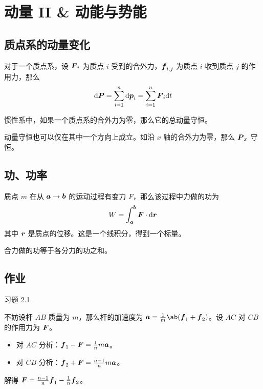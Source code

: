 \section{动量 II \& 动能与势能}

\subsection{质点系的动量变化}

\begin{theorem}[质点系的动量变化定理]
    对于一个质点系，设 $\boldsymbol{F}_i$ 为质点 $i$ 受到的合外力，$\boldsymbol{f}_{i, j}$ 为质点 $i$ 收到质点 $j$ 的作用力，那么
    $$
    \dd \boldsymbol{P} = \sum_{i=1}^n \dd \boldsymbol{p}_i = \sum_{i=1}^n \boldsymbol{F}_i \dd t
    $$
\end{theorem}

\begin{theorem}[动量守恒定律]
    惯性系中，如果一个质点系的合外力为零，那么它的总动量守恒。
\end{theorem}

动量守恒也可以仅在其中一个方向上成立。如沿 $x$ 轴的合外力为零，那么 $\boldsymbol{P}_x$ 守恒。

\subsection{功、功率}

质点 $m$ 在从 $\boldsymbol{a} \to \boldsymbol{b}$ 的运动过程有变力 $F$，那么该过程中力做的功为
$$
W = \int_{\boldsymbol{a}}^{\boldsymbol{b}} \boldsymbol{F} \cdot \dd{\boldsymbol{r}}
$$
其中 $\boldsymbol{r}$ 是质点的位移。这是一个线积分，得到一个标量。

合力做的功等于各分力的功之和。

\subsection{作业}

\begin{problem}
    习题 2.1
    \begin{solution}
        不妨设杆 $AB$ 质量为 $m$，那么杆的加速度为 $\vect{a} = \frac{1}{m} \ab(\vect{f}_1 + \vect{f}_2)$。设 $AC$ 对 $CB$ 的作用力为 $\boldsymbol{F}$。
        \begin{itemize}
            \item 对 $AC$ 分析：$\boldsymbol{f}_1 - \boldsymbol{F} = \frac{1}{n} m \boldsymbol{a}$。
            \item 对 $CB$ 分析：$\boldsymbol{f}_2 + \boldsymbol{F} = \frac{n-1}{n} m \boldsymbol{a}$。
        \end{itemize}
        解得 $\boldsymbol{F} = \frac{n - 1}{n} \boldsymbol{f}_1 - \frac{1}{n} \boldsymbol{f}_2$。
    \end{solution}
\end{problem}

